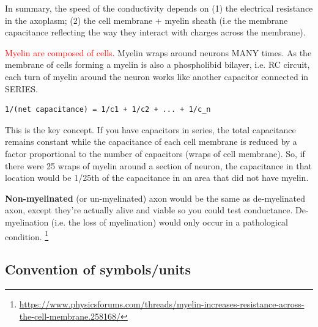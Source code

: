 In summary, the speed of the conductivity depends on (1) the electrical
resistance in the axoplasm; (2) the cell membrane + myelin sheath (i.e the
membrane capacitance reflecting the way they interact with charges across the
membrane).

\textcolor{red}{Myelin are composed of cells}. Myelin wraps around neurons MANY times.
As the membrane of cells forming a myelin is also a phospholibid bilayer, i.e.
RC circuit, each turn of myelin around the neuron works like another capacitor
connected in SERIES.
\begin{verbatim}
1/(net capacitance) = 1/c1 + 1/c2 + ... + 1/c_n
\end{verbatim}

This is the key concept. If you have capacitors in series, the total capacitance
remains constant while the capacitance of each cell membrane is reduced by a
factor proportional to the number of capacitors (wraps of cell membrane). So, if
there were 25 wraps of myelin around a section of neuron, the capacitance in
that location would be 1/25th of the capacitance in an area that did not have
myelin.

{\bf Non-myelinated} (or un-myelinated) axon would be the same as de-myelinated
axon, except they're actually alive and viable so you could test conductance. De-myelination
(i.e. the loss of myelination) would only occur in a pathological condition.
\footnote{\url{https://www.physicsforums.com/threads/myelin-increases-resistance-across-the-cell-membrane.258168/}}


\subsection{Convention of symbols/units}
\label{sec:specific-resistivity}


